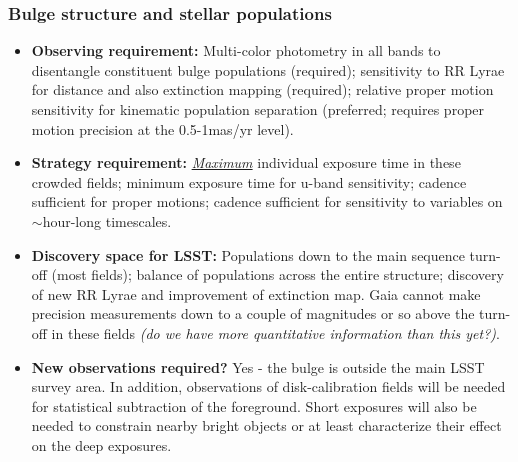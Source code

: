 \subsubsection{Bulge structure and stellar populations}
\vspace{-2mm}
\begin{itemize}
\item {\bf Observing requirement:} Multi-color photometry in all bands to disentangle constituent bulge populations (required); sensitivity to RR Lyrae for distance and also extinction mapping (required); relative proper motion sensitivity for kinematic population separation (preferred; requires proper motion precision at the 0.5-1mas/yr level). 
\vspace{-2mm}

\item {\bf Strategy requirement:} \underline{\it Maximum} individual exposure time in these crowded fields; minimum exposure time for u-band sensitivity; cadence sufficient for proper motions; cadence sufficient for sensitivity to variables on $\sim$hour-long timescales.
\vspace{-2mm}

\item {\bf Discovery space for LSST:} Populations down to the main sequence turn-off (most fields); balance of populations across the entire structure; discovery of new RR Lyrae and improvement of extinction map. Gaia cannot make precision measurements down to a couple of magnitudes or so above the turn-off in these fields {\it (do we have more quantitative information than this yet?)}.
\vspace{-2mm}

\item {\bf New observations required?} Yes - the bulge is outside the
  main LSST survey area. In addition, observations of disk-calibration
  fields will be needed for statistical subtraction of the
  foreground. Short exposures will also be needed to constrain nearby
  bright objects or at least characterize their effect on the deep
  exposures.
\vspace{2mm}
\end{itemize}

